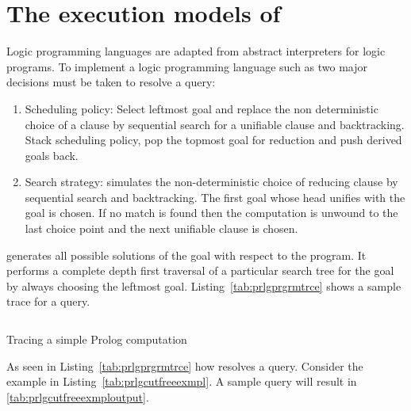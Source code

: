 \documentclass[thesis-solanki.tex]{subfiles}
\begin{document}
\section[{The execution models of \progLang{Prolog}}]{The execution models of  \cite{Sterling:1994:APA:175753}
}\label{sec:exec-models-prolog}
Logic programming languages are adapted from abstract interpreters for logic programs. 
To implement a logic programming language such as  two major decisions must be taken to resolve a query:
\begin{enumerate}
\item Scheduling policy:
Select leftmost goal and replace the non deterministic choice of a clause by sequential search for a unifiable clause and backtracking. 
Stack scheduling policy, pop the topmost goal for reduction and push derived goals back.

\item Search strategy:
 simulates the non-deterministic choice of reducing clause by sequential search and backtracking. The first goal whose 
head unifies with the goal is chosen. If no match is found then the computation is unwound to the last choice point and the next unifiable 
clause is chosen.
\end{enumerate}

 generates all possible solutions of the goal with respect to the  program. It performs a complete
depth first traversal of a particular search tree for the goal by always choosing the leftmost goal. Listing~\ref{tab:prlgprgrmtrce} shows
a sample trace for a query.

\begin{code-list}[H]
  \begin{singlespace}
    \inputminted[linenos]{prolog}{prologprogramtrace.pl}
  \end{singlespace}
  \caption{Tracing a simple Prolog computation \cite{Sterling:1994:APA:175753}}
\label{tab:prlgprgrmtrce}
\end{code-list}

As seen in Listing~\ref{tab:prlgprgrmtrce} how  resolves a query. Consider the example in 
Listing~\ref{tab:prlgcutfreeexmpl}. A sample query  will result in \ref{tab:prlgcutfreeexmploutput}. 
\end{document}
